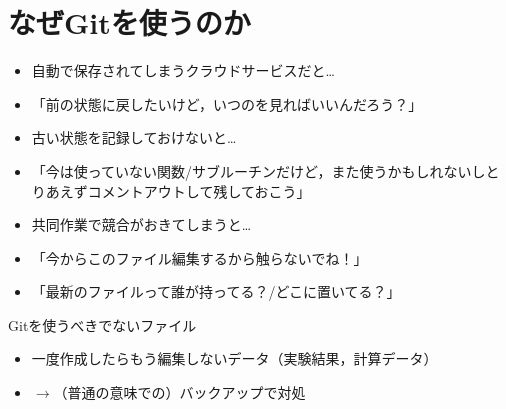 \documentclass[12pt,dvipdfmx,svgnames,uplatex,aspectratio=169]{beamer}
\begin{document}
\section{なぜGitを使うのか}
\begin{frame}{\insertsection}
  \begin{itemize}
    \item 自動で保存されてしまうクラウドサービスだと…
    \item[] 「前の状態に戻したいけど，いつのを見ればいいんだろう？」
    \item 古い状態を記録しておけないと…
    \item[] 「今は使っていない関数/サブルーチンだけど，また使うかもしれないしとりあえずコメントアウトして残しておこう」
    \item 共同作業で競合がおきてしまうと…
    \item[] 「今からこのファイル編集するから触らないでね！」
    \item[] 「最新のファイルって誰が持ってる？/どこに置いてる？」
  \end{itemize}

  \begin{block}{Gitを使うべきでないファイル}
    \begin{itemize}
      \item 一度作成したらもう編集しないデータ（実験結果，計算データ）
      \item[] \(\to\)（普通の意味での）バックアップで対処
    \end{itemize}
  \end{block}
\end{frame}
\end{document}
